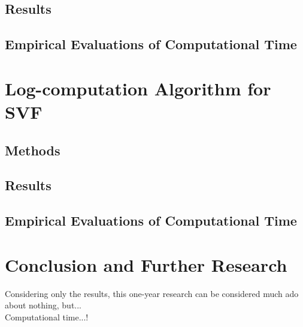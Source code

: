 \subsection{Results}

\subsection{Empirical Evaluations of Computational Time}

\section{Log-computation Algorithm for SVF}

\subsection{Methods}

\subsection{Results}


\subsection{Empirical Evaluations of Computational Time}


\section{Conclusion and Further Research}\label{ch:conclusions}


Considering only the results, this one-year research can be considered much ado about nothing, but...\\
Computational time...!